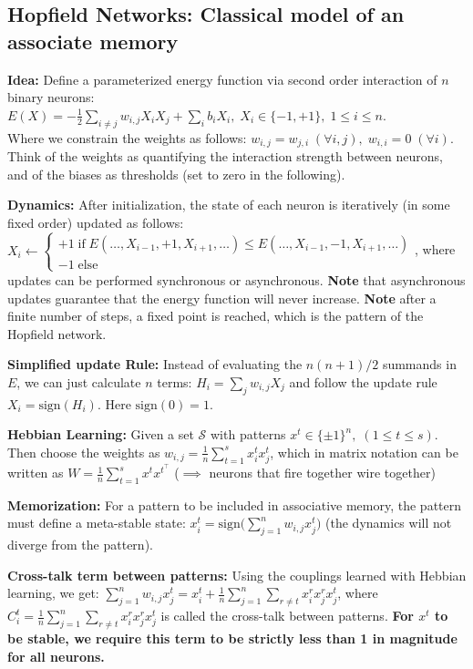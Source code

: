 \subsection{Hopfield Networks: Classical model of an associate memory} 

\textbf{Idea:} Define a parameterized energy function via
second order interaction of $n$ binary neurons: \\ $E(X) = -\frac{1}{2}\sum_{i \neq j} w_{i,j}X_iX_j + \sum_i b_i X_i, \; X_i \in \{-1, +1\}, \; 1 \leq i \leq n$. \\ Where we constrain the weights as follows: $w_{i,j} = w_{j, i} \;(\forall i, j), \; w_{i, i} = 0\; (\forall i)$. Think of the weights as quantifying the interaction strength between neurons, and of the biases as thresholds (set to zero in the following).


\textbf{Dynamics:} After initialization, the state of each neuron is iteratively (in some fixed order) updated as follows: $X_i \leftarrow \begin{cases}
    +1 \; \text{if}\; E(\dots, X_{i-1}, +1, X_{i+1}, \dots) \leq E(\dots, X_{i-1}, -1, X_{i+1}, \dots) \\
    -1 \; \text{else}
\end{cases}$, where updates can be performed synchronous or asynchronous. \textbf{Note} that asynchronous updates guarantee that the energy function will never increase. \textbf{Note} after a finite number of steps, a fixed point is reached, which is the pattern of the Hopfield network.


\textbf{Simplified update Rule:} Instead of evaluating the $n(n+1)/2$ summands in $E$, we can just calculate $n$ terms: $H_i =\sum_j w_{i,j} X_j$ and follow the update rule $X_i=\text{sign}(H_i)$. Here $\text{sign}(0) = 1$.


\textbf{Hebbian Learning:} Given a set $\mathcal{S}$ with patterns $x^t \in \{\pm1\}^n, \; (1\leq t \leq s)$. Then choose the weights as $w_{i,j} = \frac{1}{n}\sum_{t = 1}^s x_i^tx_j^t$, which in matrix notation can be written as $W = \frac{1}{n} \sum_{t = 1}^s x^t x^{t^{\intercal}}$ ($\implies$ neurons that fire together wire together)


\textbf{Memorization:} For a pattern to be included in associative memory, the pattern must define a meta-stable state: $x_i^t = \text{sign}\big(\sum_{j = 1}^n w_{i,j} x_j^t\big)$ (the dynamics will not diverge from the pattern).


\textbf{Cross-talk term between patterns:} Using the couplings learned with Hebbian learning, we get: $\sum_{j = 1}^n w_{i,j} x_j^t = x_i^t + \frac{1}{n} \sum_{j = 1}^n \sum_{r \neq t} x_i^r x_j^r x_j^t$, where $C_i^t = \frac{1}{n} \sum_{j = 1}^n \sum_{r \neq t} x_i^r x_j^r x_j^t$ is called the cross-talk between patterns. \textbf{For $x^t$ to be stable, we require this term to be strictly less than 1 in magnitude for all neurons.} 



